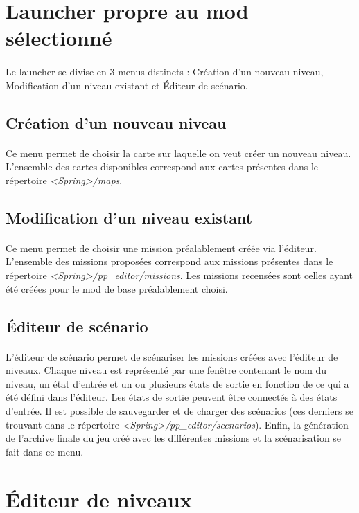 \documentclass[a4paper]{article}
\begin{document}
\section{Launcher propre au mod sélectionné}
\paragraph{ }
Le launcher se divise en 3 menus distincts : Création d'un nouveau niveau, Modification d'un niveau existant et Éditeur de scénario.
\subsection{Création d'un nouveau niveau}
\paragraph{ }
Ce menu permet de choisir la carte sur laquelle on veut créer un nouveau niveau. L'ensemble des cartes disponibles correspond aux cartes présentes dans le répertoire \textit{<Spring>/maps}.
\subsection{Modification d'un niveau existant}
\paragraph{ }
Ce menu permet de choisir une mission préalablement créée via l'éditeur. L'ensemble des missions proposées correspond aux missions présentes dans le répertoire \textit{<Spring>/pp\_editor/missions}. Les missions recensées sont celles ayant été créées pour le mod de base préalablement choisi.
\subsection{Éditeur de scénario}
\paragraph{ }
L'éditeur de scénario permet de scénariser les missions créées avec l'éditeur de niveaux. Chaque niveau est représenté par une fenêtre contenant le nom du niveau, un état d'entrée et un ou plusieurs états de sortie en fonction de ce qui a été défini dans l'éditeur. Les états de sortie peuvent être connectés à des états d'entrée. Il est possible de sauvegarder et de charger des scénarios (ces derniers se trouvant dans le répertoire \textit{<Spring>/pp\_editor/scenarios}). Enfin, la génération de l'archive finale du jeu créé avec les différentes missions et la scénarisation se fait dans ce menu.
\section{Éditeur de niveaux}
\end{document}
